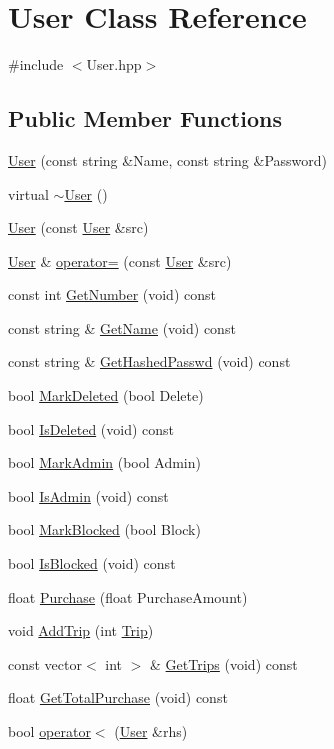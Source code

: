 \hypertarget{classUser}{\section{User Class Reference}
\label{classUser}
}


{\ttfamily \#include $<$User.\-hpp$>$}

\subsection*{Public Member Functions}
\begin{DoxyCompactItemize}
\item 
\hyperlink{classUser_a6eac4d795eb00dd593420fe958e4c065}{User} (const string \&Name, const string \&Password)
\item 
virtual \hyperlink{classUser_ac00b72ad64eb4149f7b21b9f5468c2b2}{$\sim$\-User} ()
\item 
\hyperlink{classUser_afaee5de8c92bac691705144d524c0603}{User} (const \hyperlink{classUser}{User} \&src)
\item 
\hyperlink{classUser}{User} \& \hyperlink{classUser_a6a108fd294b05801932c988e500960ed}{operator=} (const \hyperlink{classUser}{User} \&src)
\item 
const int \hyperlink{classUser_ac4863972c5f3e83492ed6aef96831823}{Get\-Number} (void) const 
\item 
const string \& \hyperlink{classUser_add35a9560dfdffbfa68131659cb73042}{Get\-Name} (void) const 
\item 
const string \& \hyperlink{classUser_a6d4df29ccff3066db39c8e382dc35e25}{Get\-Hashed\-Passwd} (void) const 
\item 
bool \hyperlink{classUser_aa6dde0521a45afe94251ab635c2c7011}{Mark\-Deleted} (bool Delete)
\item 
bool \hyperlink{classUser_a87987969d79e97bc15fdd17179a2a783}{Is\-Deleted} (void) const 
\item 
bool \hyperlink{classUser_a0efba1a031faf9ce8626d705fc70f053}{Mark\-Admin} (bool Admin)
\item 
bool \hyperlink{classUser_ad24d48713d03bf244af83e9780397077}{Is\-Admin} (void) const 
\item 
bool \hyperlink{classUser_a4deef20946b4e92147c02b855a5c31b9}{Mark\-Blocked} (bool Block)
\item 
bool \hyperlink{classUser_a5f04d5bbe4e4b77930bcdb127fc07b51}{Is\-Blocked} (void) const 
\item 
float \hyperlink{classUser_a662c053f774423b975955744f06044ad}{Purchase} (float Purchase\-Amount)
\item 
void \hyperlink{classUser_abe5567c17840f6b017449fd03778109f}{Add\-Trip} (int \hyperlink{classTrip}{Trip})
\item 
const vector$<$ int $>$ \& \hyperlink{classUser_ad18180f581f680eece112ce2500173f4}{Get\-Trips} (void) const 
\item 
float \hyperlink{classUser_a911545fcb63f3e7c0cb23a750906f0a4}{Get\-Total\-Purchase} (void) const 
\item 
bool \hyperlink{classUser_ad2dacdc322f613dd5f409d346677ebef}{operator$<$} (\hyperlink{classUser}{User} \&rhs)
\end{DoxyCompactItemize}
